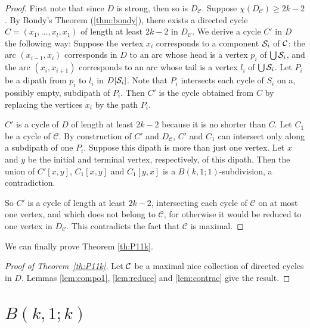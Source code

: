 \documentclass[utf8,10pt]{article}
\theoremstyle{plain}
\theoremstyle{definition}
\theoremstyle{remark}
\begin{document}
\begin{proof}
First note that since $D$ is strong, then so is $D_{\mathcal{C}}$. Suppose $\chi(D_{\mathcal{C}}) \geq 2k-2$. By Bondy's Theorem (\ref{thm:bondy}), there exists a directed cycle
$C = (x_1, \dots , x_l, x_1)$ of length at least $2k-2$ in $ D_{\mathcal{C}}$. We derive a cycle $C'$ in $D$ the following way:
Suppose the vertex $x_i$ corresponds to a component ${\cal S}_i$ of ${\cal C}$: the arc $(x_{i-1},x_i)$ corresponds in $D$ to an arc whose head
is a vertex $p_i$ of $\bigcup {\cal S}_i$, and the arc $(x_i,x_{i+1})$ corresponds to an arc whose tail is a vertex  $l_i$ of $\bigcup {\cal S}_i$. 
Let $P_i$ be a dipath 
from $p_i$ to $l_i$ in $D[{\cal S}_i]$. Note that $P_i$ intersects each cycle of $S_i$ on a, possibly empty, subdipath of $P_i$. 
Then $C'$ is the cycle obtained from $C$ by replacing the vertices $x_i$ by the path $P_i$.

$C'$ is a cycle of $D$ of length at least $2k-2$ because it is no shorter than $C$. Let $C_1$ be a cycle of $\mathcal{C}$. By construction of $C'$ 
and $D_{\mathcal{C}}$, $C'$ and $C_1$ can intersect only along a subdipath of one $P_i$. Suppose this dipath is more than just one vertex. Let $x$ and
$y$ be the initial and terminal vertex, respectively, of this dipath. Then the union of $C'[x,y]$,
$C_1[x,y]$ and $C_1[y,x]$ is a $B(k,1;1)$-subdivision, a contradiction.

So $C'$ is a cycle of length at least $2k-2$, intersecting each cycle of $\mathcal{C}$ on at most one vertex, and which does not belong to $\mathcal{C}$, for otherwise it would be reduced
to one vertex in $D_{\mathcal{C}}$. This contradicts the fact that $\mathcal{C}$ is maximal.
\end{proof}

We can finally prove Theorem \ref{th:P11k}.

\begin{proof}[Proof of Theorem~\ref{th:P11k}]
Let ${\cal C}$ be a maximal nice collection of directed cycles in $D$.  Lemmas \ref{lem:compo1}, \ref{lem:reduce} and \ref{lem:contrac} give the result.
\end{proof}







\section{$B(k,1;k)$}\label{sec:main}
\end{document}
